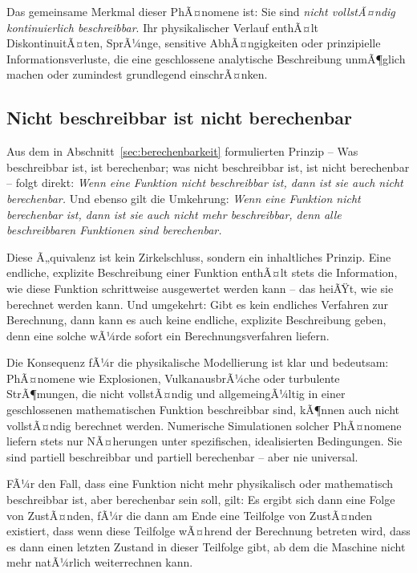 ﻿\documentclass[12pt, a4paper]{article}
\begin{document}
	Das gemeinsame Merkmal dieser PhÃ¤nomene ist: Sie sind \textit{nicht vollstÃ¤ndig kontinuierlich beschreibbar}. Ihr physikalischer Verlauf enthÃ¤lt DiskontinuitÃ¤ten, SprÃ¼nge, sensitive AbhÃ¤ngigkeiten oder prinzipielle Informationsverluste, die eine geschlossene analytische Beschreibung unmÃ¶glich machen oder zumindest grundlegend einschrÃ¤nken.

	\subsection{Nicht beschreibbar ist nicht berechenbar}

	Aus dem in Abschnitt~\ref{sec:berechenbarkeit} formulierten Prinzip -- Was beschreibbar ist, ist berechenbar; was nicht beschreibbar ist, ist nicht berechenbar -- folgt direkt: \textit{Wenn eine Funktion nicht beschreibbar ist, dann ist sie auch nicht berechenbar.}  Und ebenso gilt die Umkehrung: \textit{Wenn eine Funktion nicht berechenbar ist, dann ist sie auch nicht mehr beschreibbar, denn alle beschreibbaren Funktionen sind berechenbar.}

	Diese Ã„quivalenz ist kein Zirkelschluss, sondern ein inhaltliches Prinzip. Eine endliche, explizite Beschreibung einer Funktion enthÃ¤lt stets die Information, wie diese Funktion schrittweise ausgewertet werden kann -- das heiÃŸt, wie sie berechnet werden kann. Und umgekehrt: Gibt es kein endliches Verfahren zur Berechnung, dann kann es auch keine endliche, explizite Beschreibung geben, denn eine solche wÃ¼rde sofort ein Berechnungsverfahren liefern.

	Die Konsequenz fÃ¼r die physikalische Modellierung ist klar und bedeutsam: PhÃ¤nomene wie Explosionen, VulkanausbrÃ¼che oder turbulente StrÃ¶mungen, die nicht vollstÃ¤ndig und allgemeingÃ¼ltig in einer geschlossenen mathematischen Funktion beschreibbar sind, kÃ¶nnen auch nicht vollstÃ¤ndig berechnet werden. Numerische Simulationen solcher PhÃ¤nomene liefern stets nur NÃ¤herungen unter spezifischen, idealisierten Bedingungen. Sie sind partiell beschreibbar und partiell berechenbar -- aber nie universal.

	FÃ¼r den Fall, dass eine Funktion nicht mehr physikalisch oder mathematisch beschreibbar ist, aber berechenbar sein soll, gilt: Es ergibt sich dann eine Folge von ZustÃ¤nden, fÃ¼r die dann am Ende eine Teilfolge von ZustÃ¤nden existiert, dass wenn diese Teilfolge wÃ¤hrend der Berechnung betreten wird, dass es dann einen letzten Zustand in dieser Teilfolge gibt, ab dem die Maschine nicht mehr natÃ¼rlich weiterrechnen kann.
\end{document}
